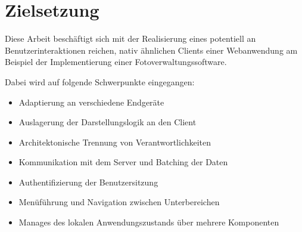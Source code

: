 \newpage

\section{Zielsetzung}
\label{sec:zielsetzung}


Diese Arbeit beschäftigt sich mit der Realisierung eines potentiell an Benutzerinteraktionen reichen, nativ ähnlichen Clients einer Webanwendung am Beispiel der Implementierung einer Fotoverwaltungssoftware.

Dabei wird auf folgende Schwerpunkte eingegangen:
\begin{itemize}
\item Adaptierung an verschiedene Endgeräte
\item Auslagerung der Darstellungslogik an den Client
\item Architektonische Trennung von Verantwortlichkeiten
\item Kommunikation mit dem Server und Batching der Daten
\item Authentifizierung der Benutzersitzung
\item Menüführung und Navigation zwischen Unterbereichen
\item Manages des lokalen Anwendungszustands über mehrere Komponenten
\end{itemize}

\newpage
